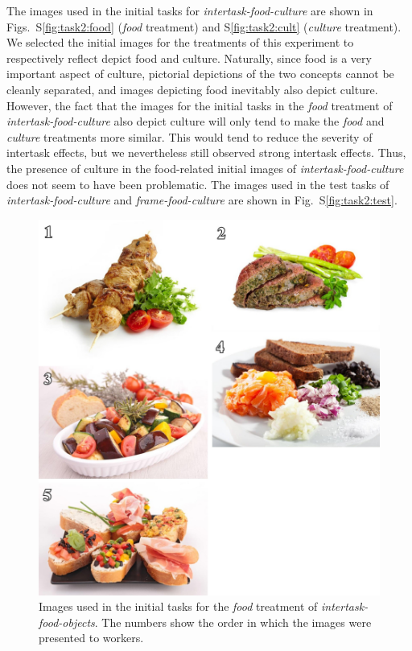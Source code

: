 \documentclass[12pt]{article}
\begin{document}
The images used in the initial tasks
for \textit{intertask-food-culture} are shown in Figs.~S\ref{fig:task2:food} 
(\textit{food} treatment) and S\ref{fig:task2:cult} 
(\textit{culture} treatment).
We selected the initial images for the treatments of this experiment to 
respectively reflect depict food and culture.
Naturally, since food is a very
important aspect of culture, pictorial depictions of the two concepts 
cannot be cleanly separated,
and images depicting food inevitably also depict culture.
However, the fact that the images for the initial tasks in the 
\textit{food} treatment 
of \textit{intertask-food-culture} also depict culture
will only tend to make the \textit{food} and \textit{culture}
treatments more similar. 
This would tend to reduce the severity of intertask 
effects, but we nevertheless still observed strong intertask effects.
Thus, the presence of culture in the food-related initial images of 
\textit{intertask-food-culture} does not seem to have been problematic.
The images used in the test tasks of \textit{intertask-food-culture} and
\textit{frame-food-culture} are shown in Fig.~S\ref{fig:task2:test}.

\begin{figure}
	\begin{center}
	\includegraphics{figs/task1-food.jpg}
	\end{center}
	\caption{
		Images used in the initial tasks for the
		\textit{food} treatment of \textit{intertask-food-objects}.  
		The numbers show the order in which the 
		images were presented to workers.
	}
	\label{fig:task1:food}
\end{figure}
\end{document}
